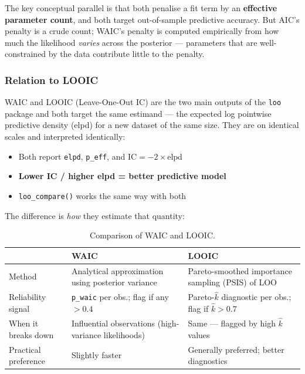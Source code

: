 \documentclass[12pt,a4paper]{article}
\begin{document}
The key conceptual parallel is that both penalise a fit term by an \textbf{effective parameter count}, and both target out-of-sample predictive accuracy. But AIC's penalty is a crude count; WAIC's penalty is computed empirically from how much the likelihood \emph{varies} across the posterior --- parameters that are well-constrained by the data contribute little to the penalty.

\subsubsection{Relation to LOOIC}

WAIC and LOOIC (Leave-One-Out IC) are the two main outputs of the \texttt{loo} package and both target the same estimand --- the expected log pointwise predictive density (elpd) for a new dataset of the same size. They are on identical scales and interpreted identically:
\begin{itemize}
  \item Both report \texttt{elpd}, \texttt{p\_eff}, and $\text{IC} = -2 \times \text{elpd}$
  \item \textbf{Lower IC / higher elpd = better predictive model}
  \item \texttt{loo\_compare()} works the same way with both
\end{itemize}

The difference is \emph{how} they estimate that quantity:

\begin{table}[ht]
\centering
\small
\begin{tabular}{p{3cm}p{5.5cm}p{5.5cm}}
\toprule
 & \textbf{WAIC} & \textbf{LOOIC} \\
\midrule
Method & Analytical approximation using posterior variance & Pareto-smoothed importance sampling (PSIS) of LOO \\
\addlinespace
Reliability signal & \texttt{p\_waic} per obs.; flag if any $> 0.4$ & Pareto-$\hat{k}$ diagnostic per obs.; flag if $\hat{k} > 0.7$ \\
\addlinespace
When it breaks down & Influential observations (high-variance likelihoods) & Same --- flagged by high $\hat{k}$ values \\
\addlinespace
Practical preference & Slightly faster & Generally preferred; better diagnostics \\
\bottomrule
\end{tabular}
\caption{Comparison of WAIC and LOOIC.}
\end{table}
\end{document}
